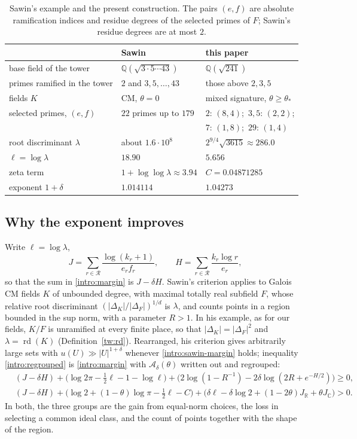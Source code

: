\documentclass[11pt]{amsart}
\numberwithin{equation}{section}
\theoremstyle{definition}
\theoremstyle{remark}
\DeclareMathOperator{\rd}{rd}
\newcommand{\Q}{\mathbb Q}
\newcommand{\R}{\mathbb R}
\newcommand{\C}{\mathbb C}
\newcommand{\ceiling}{0.04871285}
\begin{document}
\begin{table}[htbp]
\centering
\caption{Sawin's example and the present construction. The pairs $(e,f)$
are absolute ramification indices and residue degrees of the selected
primes of $F$; Sawin's residue degrees are at most $2$.}
\label{intro:table-constructions}
\begin{tabular}{lll}
\toprule
 & Sawin \cite{Sawin2026} & this paper\\
\midrule
base field of the tower & $\Q(\sqrt{3\cdot5\cdots43})$ & $\Q(\sqrt{241})$\\
primes ramified in the tower & $2$ and $3,5,\dots,43$ & those above $2,3,5$\\
fields $K$ & CM, $\theta=0$ & mixed signature, $\theta\ge\theta_*$\\
selected primes, $(e,f)$ & $22$ primes up to $179$ & $2{:}\,(8,4)$;\ $3,5{:}\,(2,2)$;\\
 & & $7{:}\,(1,8)$;\ $29{:}\,(1,4)$\\
root discriminant $\lambda$ & about $1.6\cdot10^8$ & $2^{9/4}\sqrt{3615}\approx286.0$\\
$\ell=\log\lambda$ & $18.90$ & $5.656$\\
zeta term & $1+\log\log\lambda\approx3.94$ & $C=\ceiling$\\
exponent $1+\delta$ & $1.014114$ & $1.04273$\\
\bottomrule
\end{tabular}
\end{table}

\subsection{Why the exponent improves}\label{intro:why}
Write $\ell=\log\lambda$,
\[
 J=\sum_{r\in\mathcal R}\frac{\log(k_r+1)}{e_rf_r},\qquad
 H=\sum_{r\in\mathcal R}\frac{k_r\log r}{e_r},
\]
so that the sum in \eqref{intro:margin} is $J-\delta H$. Sawin's
criterion \cite[Proposition~10]{Sawin2026} applies to Galois CM fields
$K$ of unbounded degree, with maximal totally real subfield $F$, whose
relative root discriminant $(|\Delta_K|/|\Delta_F|)^{1/d}$ is $\lambda$,
and counts points in a region bounded in the sup norm, with a parameter
$R>1$. In his example, as for our fields, $K/F$ is unramified at every
finite place, so that $|\Delta_K|=|\Delta_F|^2$ and $\lambda=\rd(K)$
(Definition~\ref{tw:rd}).
Rearranged, his criterion gives arbitrarily
large sets with $u(U)\gg|U|^{1+\delta}$ whenever
\eqref{intro:sawin-margin} holds; inequality \eqref{intro:regrouped} is
\eqref{intro:margin} with $\mathcal A_\delta(\theta)$ written out and
regrouped:
\begin{align}
 &(J-\delta H)+\bigl(\log2\pi-\tfrac12\ell-1-\log\ell\bigr)
 +\bigl(2\log(1-R^{-1})-2\delta\log(2R+e^{-H/2})\bigr)\ge0,
 \label{intro:sawin-margin}\\
 &(J-\delta H)+\bigl(\log2+(1-\theta)\log\pi-\tfrac12\ell-C\bigr)
 +\bigl(\delta\ell-\delta\log2+(1-2\theta)J_\R+\theta J_\C\bigr)>0.
 \label{intro:regrouped}
\end{align}
In both, the three groups are the gain from equal-norm choices, the loss
in selecting a common ideal class, and the count of points together
with the shape of the region.
\end{document}
